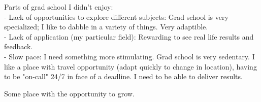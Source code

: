 \documentclass[11pt,a4paper,unicode]{moderncv}
\begin{document}
Parts of grad school I didn't enjoy:
\\- Lack of opportunities to explore different subjects: Grad school is very specialized; I like to dabble in a variety of things. Very adaptible.
\\- Lack of application (my particular field): Rewarding to see real life results and feedback.
\\- Slow pace: I need something more stimulating. Grad school is very sedentary. I like a place with travel opportunity (adapt quickly to change in location), having to be "on-call" 24/7 in face of a deadline. I need to be able to deliver results.


Some place with the opportunity to grow.

\lipsum[1] %

\makeletterclosing %
\end{document}
